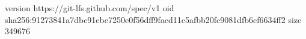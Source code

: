 version https://git-lfs.github.com/spec/v1
oid sha256:91273841a7dbc91ebe7250e0f56dff9facd11c5afbb20fc9081dfb6cf6634ff2
size 349676
